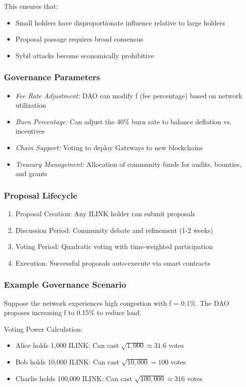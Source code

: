 \documentclass[11pt,a4paper]{article}
\begin{document}
This ensures that:
\begin{itemize}
    \item Small holders have disproportionate influence relative to large holders
    \item Proposal passage requires broad consensus
    \item Sybil attacks become economically prohibitive
\end{itemize}

\subsubsection{Governance Parameters}
\begin{itemize}
    \item \textit{Fee Rate Adjustment:} DAO can modify f (fee percentage) based on network utilization
    \item \textit{Burn Percentage:} Can adjust the 40\% burn rate to balance deflation vs. incentives
    \item \textit{Chain Support:} Voting to deploy Gateways to new blockchains
    \item \textit{Treasury Management:} Allocation of community funds for audits, bounties, and grants
\end{itemize}

\subsubsection{Proposal Lifecycle}
\begin{enumerate}
    \item Proposal Creation: Any ILINK holder can submit proposals
    \item Discussion Period: Community debate and refinement (1-2 weeks)
    \item Voting Period: Quadratic voting with time-weighted participation
    \item Execution: Successful proposals auto-execute via smart contracts
\end{enumerate}

\subsubsection{Example Governance Scenario}
Suppose the network experiences high congestion with f = 0.1\%. The DAO proposes increasing f to 0.15\% to reduce load.

Voting Power Calculation:
\begin{itemize}
    \item Alice holds 1,000 ILINK: Can cast $\sqrt{1,000} \approx 31.6$ votes
    \item Bob holds 10,000 ILINK: Can cast $\sqrt{10,000} = 100$ votes  
    \item Charlie holds 100,000 ILINK: Can cast $\sqrt{100,000} \approx 316$ votes
\end{itemize}
\end{document}
